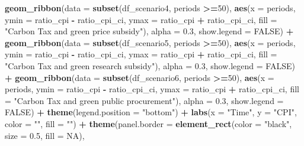 \documentclass[
]{article}
\newenvironment{Shaded}{\begin{snugshade}}{\end{snugshade}}
\newcommand{\AttributeTok}[1]{\textcolor[rgb]{0.13,0.29,0.53}{#1}}
\newcommand{\ConstantTok}[1]{\textcolor[rgb]{0.56,0.35,0.01}{#1}}
\newcommand{\DecValTok}[1]{\textcolor[rgb]{0.00,0.00,0.81}{#1}}
\newcommand{\FloatTok}[1]{\textcolor[rgb]{0.00,0.00,0.81}{#1}}
\newcommand{\FunctionTok}[1]{\textcolor[rgb]{0.13,0.29,0.53}{\textbf{#1}}}
\newcommand{\NormalTok}[1]{#1}
\newcommand{\SpecialCharTok}[1]{\textcolor[rgb]{0.81,0.36,0.00}{\textbf{#1}}}
\newcommand{\StringTok}[1]{\textcolor[rgb]{0.31,0.60,0.02}{#1}}
\begin{document}
\begin{Shaded}
\begin{Highlighting}[]
  \FunctionTok{geom\_ribbon}\NormalTok{(}\AttributeTok{data =} \FunctionTok{subset}\NormalTok{(df\_scenario4, periods }\SpecialCharTok{\textgreater{}=}\DecValTok{50}\NormalTok{), }\FunctionTok{aes}\NormalTok{(}\AttributeTok{x =}\NormalTok{ periods, }\AttributeTok{ymin =}\NormalTok{ ratio\_cpi }\SpecialCharTok{{-}}\NormalTok{ ratio\_cpi\_ci, }\AttributeTok{ymax =}\NormalTok{ ratio\_cpi }\SpecialCharTok{+}\NormalTok{ ratio\_cpi\_ci, }\AttributeTok{fill =} \StringTok{"Carbon Tax and green price subsidy"}\NormalTok{), }\AttributeTok{alpha =} \FloatTok{0.3}\NormalTok{, }\AttributeTok{show.legend =} \ConstantTok{FALSE}\NormalTok{) }\SpecialCharTok{+}
  \FunctionTok{geom\_ribbon}\NormalTok{(}\AttributeTok{data =} \FunctionTok{subset}\NormalTok{(df\_scenario5, periods }\SpecialCharTok{\textgreater{}=}\DecValTok{50}\NormalTok{), }\FunctionTok{aes}\NormalTok{(}\AttributeTok{x =}\NormalTok{ periods, }\AttributeTok{ymin =}\NormalTok{ ratio\_cpi }\SpecialCharTok{{-}}\NormalTok{ ratio\_cpi\_ci, }\AttributeTok{ymax =}\NormalTok{ ratio\_cpi }\SpecialCharTok{+}\NormalTok{ ratio\_cpi\_ci, }\AttributeTok{fill =} \StringTok{"Carbon Tax and green research subsidy"}\NormalTok{), }\AttributeTok{alpha =} \FloatTok{0.3}\NormalTok{, }\AttributeTok{show.legend =} \ConstantTok{FALSE}\NormalTok{) }\SpecialCharTok{+}
  \FunctionTok{geom\_ribbon}\NormalTok{(}\AttributeTok{data =} \FunctionTok{subset}\NormalTok{(df\_scenario6, periods }\SpecialCharTok{\textgreater{}=}\DecValTok{50}\NormalTok{), }\FunctionTok{aes}\NormalTok{(}\AttributeTok{x =}\NormalTok{ periods, }\AttributeTok{ymin =}\NormalTok{ ratio\_cpi }\SpecialCharTok{{-}}\NormalTok{ ratio\_cpi\_ci, }\AttributeTok{ymax =}\NormalTok{ ratio\_cpi }\SpecialCharTok{+}\NormalTok{ ratio\_cpi\_ci, }\AttributeTok{fill =} \StringTok{"Carbon Tax and green public procurement"}\NormalTok{), }\AttributeTok{alpha =} \FloatTok{0.3}\NormalTok{, }\AttributeTok{show.legend =} \ConstantTok{FALSE}\NormalTok{) }\SpecialCharTok{+}
  \FunctionTok{theme}\NormalTok{(}\AttributeTok{legend.position =} \StringTok{"bottom"}\NormalTok{) }\SpecialCharTok{+}
  \FunctionTok{labs}\NormalTok{(}\AttributeTok{x =} \StringTok{"Time"}\NormalTok{, }\AttributeTok{y =} \StringTok{"CPI"}\NormalTok{, }\AttributeTok{color =} \StringTok{""}\NormalTok{, }\AttributeTok{fill =} \StringTok{""}\NormalTok{) }\SpecialCharTok{+}
  \FunctionTok{theme}\NormalTok{(}\AttributeTok{panel.border =} \FunctionTok{element\_rect}\NormalTok{(}\AttributeTok{color =} \StringTok{"black"}\NormalTok{, }\AttributeTok{size =} \FloatTok{0.5}\NormalTok{, }\AttributeTok{fill =} \ConstantTok{NA}\NormalTok{),}

\end{Highlighting}
\end{Shaded}
\end{document}
